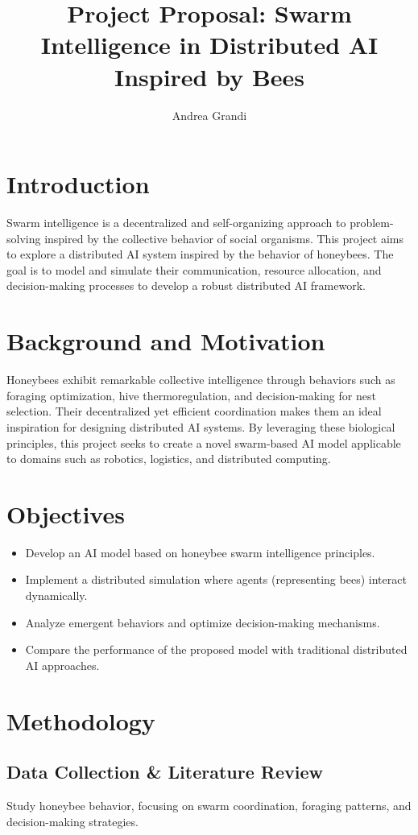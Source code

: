 \documentclass[a4paper,12pt]{article}
\title{\textbf{Project Proposal: Swarm Intelligence in Distributed AI Inspired by Bees}}
\author{Andrea Grandi {}}
\date{}
\begin{document}
\maketitle

\section{Introduction}
Swarm intelligence is a decentralized and self-organizing approach to problem-solving inspired by the collective behavior of social organisms. This project aims to explore a distributed AI system inspired by the behavior of honeybees. The goal is to model and simulate their communication, resource allocation, and decision-making processes to develop a robust distributed AI framework.

\section{Background and Motivation}
Honeybees exhibit remarkable collective intelligence through behaviors such as foraging optimization, hive thermoregulation, and decision-making for nest selection. Their decentralized yet efficient coordination makes them an ideal inspiration for designing distributed AI systems. By leveraging these biological principles, this project seeks to create a novel swarm-based AI model applicable to domains such as robotics, logistics, and distributed computing.

\section{Objectives}
\begin{itemize}
    \item Develop an AI model based on honeybee swarm intelligence principles.
    \item Implement a distributed simulation where agents (representing bees) interact dynamically.
    \item Analyze emergent behaviors and optimize decision-making mechanisms.
    \item Compare the performance of the proposed model with traditional distributed AI approaches.
\end{itemize}

\section{Methodology}
\subsection{Data Collection \& Literature Review}
Study honeybee behavior, focusing on swarm coordination, foraging patterns, and decision-making strategies.
\end{document}
